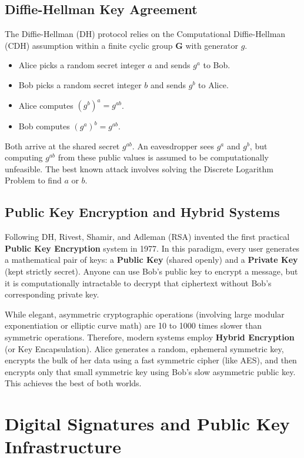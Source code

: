 \subsection{Diffie-Hellman Key Agreement}
The Diffie-Hellman (DH) protocol relies on the Computational Diffie-Hellman (CDH) assumption within a finite cyclic group $\mathbf{G}$ with generator $g$. 
\begin{itemize}
    \item Alice picks a random secret integer $a$ and sends $g^a$ to Bob.
    \item Bob picks a random secret integer $b$ and sends $g^b$ to Alice.
    \item Alice computes $(g^b)^a = g^{ab}$.
    \item Bob computes $(g^a)^b = g^{ab}$.
\end{itemize}
Both arrive at the shared secret $g^{ab}$. An eavesdropper sees $g^a$ and $g^b$, but computing $g^{ab}$ from these public values is assumed to be computationally unfeasible. The best known attack involves solving the Discrete Logarithm Problem to find $a$ or $b$.

\subsection{Public Key Encryption and Hybrid Systems}
Following DH, Rivest, Shamir, and Adleman (RSA) invented the first practical \textbf{Public Key Encryption} system in 1977. In this paradigm, every user generates a mathematical pair of keys: a \textbf{Public Key} (shared openly) and a \textbf{Private Key} (kept strictly secret). Anyone can use Bob's public key to encrypt a message, but it is computationally intractable to decrypt that ciphertext without Bob's corresponding private key. 

While elegant, asymmetric cryptographic operations (involving large modular exponentiation or elliptic curve math) are 10 to 1000 times slower than symmetric operations. Therefore, modern systems employ \textbf{Hybrid Encryption} (or Key Encapsulation). Alice generates a random, ephemeral symmetric key, encrypts the bulk of her data using a fast symmetric cipher (like AES), and then encrypts only that small symmetric key using Bob's slow asymmetric public key. This achieves the best of both worlds.

\section{Digital Signatures and Public Key Infrastructure}

